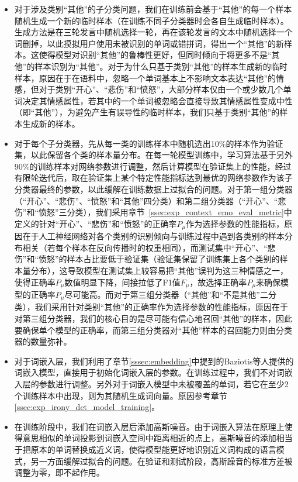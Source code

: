 \begin{itemize}

\item 对于涉及类别“其他”的子分类问题，我们在训练前会基于“其他”的每一个样本随机生成一个新的临时样本（在训练不同子分类器时会各自生成临时样本）。生成方法是在三轮发言中随机选择一轮，再在该轮发言的文本中随机选择一个词删掉，以此摸拟用户使用未被识别的单词或错拼词，得出一个“其他”的新样本。这使得模型对识别“其他”的鲁棒性更好，但同时倾向于将更多不是“其他”的样本识别为“其他”。对于为什么只基于类别“其他”的样本生成新的临时样本，原因在于在语料中，忽略一个单词基本上不影响文本表达“其他”的情感，但对于类别“开心”、“悲伤”和“愤怒”，大部分样本仅由一个或少数几个单词决定其情感属性，若其中的一个单词被忽略会直接导致其情感属性变成中性（即“其他”），为避免产生有误导性的临时样本，我们只基于类别“其他”的样本生成新的样本。

\item 对于每个子分类器，先从每一类的训练样本中随机选出10\%的样本作为验证集，以此保留各个类的样本量分布。在每一轮模型训练中，学习算法基于另外90\%的训练样本对网络参数进行调整，然后计算模型在验证集上的性能，经过有限轮迭代后，取在验证集上某个特定性能指标达到最优的网络参数作为该子分类器最终的参数，以此缓解在训练数据上过拟合的问题。对于第一组分类器（“开心”、“悲伤”、“愤怒”和“其他”四分类）和第二组分类器（“开心”、“悲伤”和“愤怒”三分类），我们采用章节~\ref{ssec:exp_context_emo_eval_metric}中定义的针对“开心”、“悲伤”和“愤怒”的正确率$P_\mu$作为选择参数的性能指标，原因在于人工神经网络对各个类别的识别倾向与训练过程中遇到各类别的样本分布相关（若每个样本在反向传播时的权重相同），而测试集中“开心”、“悲伤”和“愤怒”的样本占比要低于验证集（验证集保留了训练集上各个类别的样本量分布），这导致模型在测试集上较容易把“其他”误判为这三种情感之一，使得正确率$P_\mu$数值明显下降，间接拉低了F1值$F_\mu$，故选择正确率$P_\mu$来确保模型的正确率$P_\mu$尽可能高。而对于第三组分类器（“其他”和“不是其他”二分类），我们采用针对类别“其他”的正确率作为选择参数的性能指标，原因在于对第三组分类器，我们的核心目的是尽可能有信心地召回“其他”的样本，因此要确保单个模型的正确率，而第三组分类器对“其他”样本的召回能力则由分类器的数量弥补。

\item 对于词嵌入层，我们利用了章节\ref{sssec:embedding}中提到的Baziotis等人\cite{baziotis2018ntua}提供的词嵌入模型，直接用于初始化词嵌入层的参数。在训练过程中，我们不对词嵌入层的参数进行调整。另外对于词嵌入模型中未被覆盖的单词，若它在至少2个训练样本中出现，则为其随机生成词向量。原因参考章节\ref{ssec:exp_irony_det_model_training}。

\item 在训练阶段中，我们在词嵌入层后添加高斯噪音。由于词嵌入算法在原理上使得意思相似的单词投影到词嵌入空间中距离相近的点上，高斯噪音的添加相当于把原本的单词替换成近义词，使得模型能更好地识别近义词构成的语言模式，另一方面缓解过拟合的问题。在验证和测试阶段，高斯躁音的标准方差被调整为零，即不起作用。


\end{itemize}

